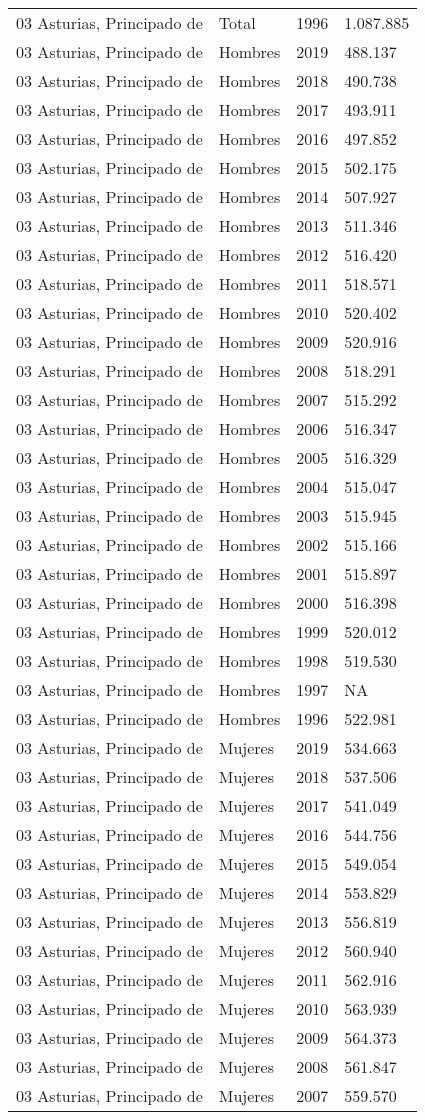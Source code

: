 \documentclass[
]{article}
\begin{document}
\begin{longtable}[]{@{}llrl@{}}
03 Asturias, Principado de & Total & 1996 & 1.087.885\tabularnewline
03 Asturias, Principado de & Hombres & 2019 & 488.137\tabularnewline
03 Asturias, Principado de & Hombres & 2018 & 490.738\tabularnewline
03 Asturias, Principado de & Hombres & 2017 & 493.911\tabularnewline
03 Asturias, Principado de & Hombres & 2016 & 497.852\tabularnewline
03 Asturias, Principado de & Hombres & 2015 & 502.175\tabularnewline
03 Asturias, Principado de & Hombres & 2014 & 507.927\tabularnewline
03 Asturias, Principado de & Hombres & 2013 & 511.346\tabularnewline
03 Asturias, Principado de & Hombres & 2012 & 516.420\tabularnewline
03 Asturias, Principado de & Hombres & 2011 & 518.571\tabularnewline
03 Asturias, Principado de & Hombres & 2010 & 520.402\tabularnewline
03 Asturias, Principado de & Hombres & 2009 & 520.916\tabularnewline
03 Asturias, Principado de & Hombres & 2008 & 518.291\tabularnewline
03 Asturias, Principado de & Hombres & 2007 & 515.292\tabularnewline
03 Asturias, Principado de & Hombres & 2006 & 516.347\tabularnewline
03 Asturias, Principado de & Hombres & 2005 & 516.329\tabularnewline
03 Asturias, Principado de & Hombres & 2004 & 515.047\tabularnewline
03 Asturias, Principado de & Hombres & 2003 & 515.945\tabularnewline
03 Asturias, Principado de & Hombres & 2002 & 515.166\tabularnewline
03 Asturias, Principado de & Hombres & 2001 & 515.897\tabularnewline
03 Asturias, Principado de & Hombres & 2000 & 516.398\tabularnewline
03 Asturias, Principado de & Hombres & 1999 & 520.012\tabularnewline
03 Asturias, Principado de & Hombres & 1998 & 519.530\tabularnewline
03 Asturias, Principado de & Hombres & 1997 & NA\tabularnewline
03 Asturias, Principado de & Hombres & 1996 & 522.981\tabularnewline
03 Asturias, Principado de & Mujeres & 2019 & 534.663\tabularnewline
03 Asturias, Principado de & Mujeres & 2018 & 537.506\tabularnewline
03 Asturias, Principado de & Mujeres & 2017 & 541.049\tabularnewline
03 Asturias, Principado de & Mujeres & 2016 & 544.756\tabularnewline
03 Asturias, Principado de & Mujeres & 2015 & 549.054\tabularnewline
03 Asturias, Principado de & Mujeres & 2014 & 553.829\tabularnewline
03 Asturias, Principado de & Mujeres & 2013 & 556.819\tabularnewline
03 Asturias, Principado de & Mujeres & 2012 & 560.940\tabularnewline
03 Asturias, Principado de & Mujeres & 2011 & 562.916\tabularnewline
03 Asturias, Principado de & Mujeres & 2010 & 563.939\tabularnewline
03 Asturias, Principado de & Mujeres & 2009 & 564.373\tabularnewline
03 Asturias, Principado de & Mujeres & 2008 & 561.847\tabularnewline
03 Asturias, Principado de & Mujeres & 2007 & 559.570\tabularnewline

\end{longtable}
\end{document}
